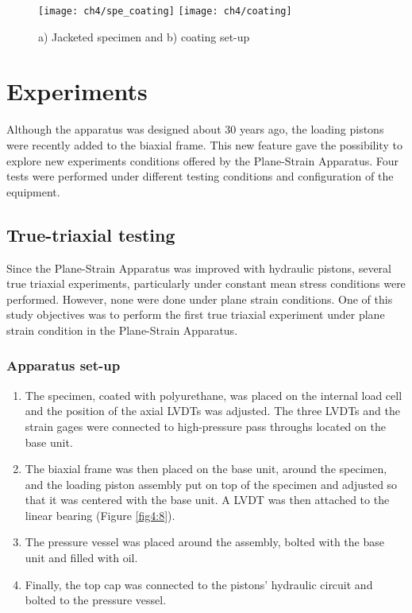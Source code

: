 \begin{figure}[tb]
    \centering
    \texttt{[image: ch4/spe\_coating]}
    \texttt{[image: ch4/coating]}
    \caption{a) Jacketed specimen and b) coating set-up}
    \label{fig4:7}
\end{figure} 

\section{Experiments} \label{ch4:exp}

Although the apparatus was designed about 30 years ago, the loading pistons were recently added to the biaxial frame. This new feature gave the possibility to explore new experiments conditions offered by the Plane-Strain Apparatus. Four tests were performed under different testing conditions and configuration of the equipment. 

\subsection{True-triaxial testing }

Since the Plane-Strain Apparatus was improved with hydraulic pistons, several true triaxial experiments, particularly under constant mean stress conditions were performed. However, none were done under plane strain conditions. One of this study objectives was to perform the first true triaxial experiment under plane strain condition in the Plane-Strain Apparatus. 

\subsubsection{Apparatus set-up}

\begin{enumerate}
    \item The specimen, coated with polyurethane, was placed on the internal load cell and the position of the axial LVDTs was adjusted. The three LVDTs and the strain gages were connected to high-pressure pass throughs located on the base unit. 
    \item The biaxial frame was then placed on the base unit, around the specimen, and the loading piston assembly put on top of the specimen and adjusted so that it was centered with the base unit. A LVDT was then attached to the linear bearing (Figure \ref{fig4:8}). 
    \item The pressure vessel was placed around the assembly, bolted with the base unit and filled with oil. 
    \item Finally, the top cap was connected to the pistons’ hydraulic circuit and bolted to the pressure vessel. 
\end{enumerate}


